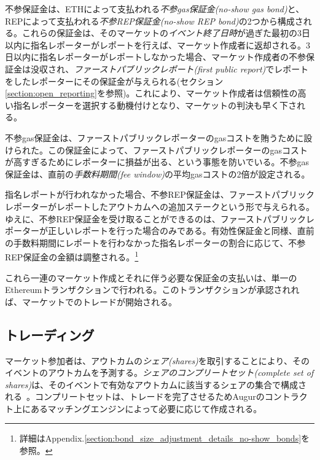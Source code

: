 \documentclass[floatfix,reprint,nofootinbib,amsmath,amssymb,epsfig,pre,floats,letterpaper,groupedaffiliation]{revtex4-1}
\theoremstyle{definition}
\theoremstyle{definition}
\theoremstyle{definition}
\begin{document}
不参保証金は、ETHによって支払われる\textit{不参gas保証金(no-show gas bond)}と、REPによって支払われる\textit{不参REP保証金(no-show REP bond)}の2つから構成される。これらの保証金は、そのマーケットの\textit{イベント終了日時}が過ぎた最初の3日以内に指名レポーターがレポートを行えば、マーケット作成者に返却される。3日以内に指名レポーターがレポートしなかった場合、マーケット作成者の不参保証金は没収され、\textit{ファーストパブリックレポート(first public report)}でレポートをしたレポーターにその保証金が与えられる(セクション\ref{section:open_reporting}を参照)。これにより、マーケット作成者は信頼性の高い指名レポーターを選択する動機付けとなり、マーケットの判決も早く下される。

不参gas保証金は、ファーストパブリックレポーターのgasコストを賄うために設けられた。この保証金によって、ファーストパブリックレポーターのgasコストが高すぎるためにレポーターに損益が出る、という事態を防いでいる。不参gas保証金は、直前の\textit{手数料期間(fee window)}の平均gasコストの2倍が設定される。

指名レポートが行われなかった場合、不参REP保証金は、ファーストパブリックレポーターがレポートしたアウトカムへの追加ステークという形で与えられる。ゆえに、不参REP保証金を受け取ることができるのは、ファーストパブリックレポーターが正しいレポートを行った場合のみである。有効性保証金と同様、直前の手数料期間にレポートを行わなかった指名レポーターの割合に応じて、不参REP保証金の金額は調整される。\footnote{詳細はAppendix.\ref{section:bond_size_adjustment_details_no-show_bonds}を参照。}

これら一連のマーケット作成とそれに伴う必要な保証金の支払いは、単一のEthereumトランザクションで行われる。このトランザクションが承認されれば、マーケットでのトレードが開始される。

\subsection{トレーディング}

マーケット参加者は、アウトカムの\textit{シェア(shares)}を取引することにより、そのイベントのアウトカムを予測する。\textit{シェアのコンプリートセット(complete set of shares)}は、そのイベントで有効なアウトカムに該当するシェアの集合で構成される~\cite{Clark_2014}。コンプリートセットは、トレードを完了させるためAugurのコントラクト上にあるマッチングエンジンによって必要に応じて作成される。
\end{document}
